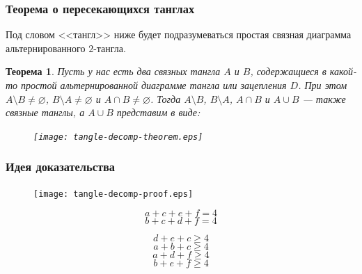 \documentclass[dvips, intlimits, 9pt, unicode, notheorems, color=usenames,dvipsnames]{beamer}
\theoremstyle{plain}
\newtheorem{theorem}{Теорема}
\theoremstyle{definition}
\begin{document}
	\begin{frame}
		\frametitle{Теорема о пересекающихся танглах}

		Под словом <<тангл>> ниже будет подразумеваться простая связная диаграмма альтернированного $2$-тангла.

		\begin{theorem}
			\label{theorem:tangle-decomp-th}
			Пусть у нас есть два связных тангла $A$ и $B$, содержащиеся в какой-то простой альтернированной диаграмме
			тангла или зацепления $D$. При этом $A\setminus B\neq\varnothing$, $B\setminus A\neq\varnothing$
			и $A\cap B\neq\varnothing$. Тогда $A\setminus B$, $B\setminus A$, $A\cap B$ и $A\cup B$ --- также связные
			танглы, а $A\cup B$ представим в виде:

			\begin{figure}[H]
				\centering
				\texttt{[image: tangle-decomp-theorem.eps]}
			\end{figure}
		\end{theorem}
	\end{frame}

	\begin{frame}
		\frametitle{Идея доказательства}

		\begin{figure}[H]
			\centering
			\texttt{[image: tangle-decomp-proof.eps]}
		\end{figure}

		\begin{equation}
			\label{equation:a_relation}
			a + c + e + f = 4
		\end{equation}
		\begin{equation}
			\label{equation:b_relation}
			b + c + d + f = 4
		\end{equation}

		\begin{equation}
			\label{equation:ab_relation}
			d + e + c \ge 4
		\end{equation}
		\begin{equation}
			\label{equation:all_relation}
			a + b + c \ge 4
		\end{equation}
		\begin{equation}
			\label{equation:amb_relation}
			a + d + f \ge 4
		\end{equation}
		\begin{equation}
			\label{equation:bma_relation}
			b + e + f \ge 4
		\end{equation}
	\end{frame}
\end{document}
